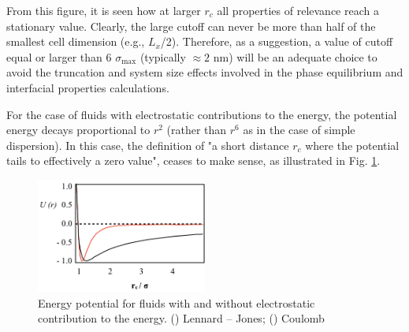 \documentclass[9pt,bestpractices]{livecoms}
\begin{document}
From this figure, it is seen how at larger $r_{c}$ all properties of
relevance reach a stationary value. Clearly, the large cutoff can never be more
than half of the smallest cell dimension (e.g., $L_{x}$/2).
Therefore, as a suggestion, a value of cutoff equal or larger than
6 ${\sigma}_{\mathrm{max}}$ (typically $\approx 2$ nm) will be an adequate choice to avoid the
truncation and system size effects involved in the phase equilibrium and
interfacial properties calculations.

For the case of fluids with electrostatic contributions to the energy, the
potential energy decays proportional to $r^{2}$ (rather than
$r^{6}$ as in the case of simple dispersion).
In this case, the definition of "a short distance $r_{c}$ where the
potential tails to effectively a zero value", ceases to make sense, as
illustrated in Fig. \ref{fig:6}. 

\begin{figure}
\includegraphics[width=0.5\textwidth]{gfx/image49.png}
\caption{Energy potential for fluids with and without electrostatic contribution to the energy. (\textcolor{color-3}{\textemdash}) Lennard -- Jones; (\textemdash) Coulomb}
\label{fig:6}
\end{figure}
\end{document}
